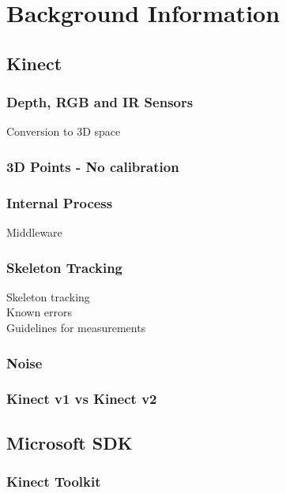 \section{Background Information}


\subsection{Kinect}

\subsubsection{Depth, RGB and IR Sensors}
Conversion to 3D space \cite{nonContact2017}\\

\subsubsection{3D Points - No calibration}

\subsubsection{Internal Process}
Middleware \cite{nonContact2017}\\

\subsubsection{Skeleton Tracking}
Skeleton tracking\\
Known errors\\
Guidelines for measurements\\

\subsubsection{Noise}

\subsubsection{Kinect v1 vs Kinect v2}


\subsection{Microsoft SDK}

\subsubsection{Kinect Toolkit}

